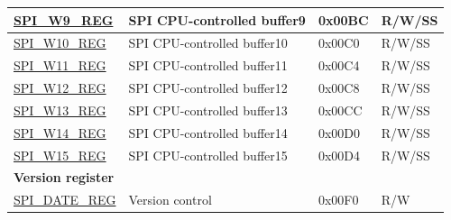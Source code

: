 \begin{longtable}{ | p{6cm} | p{6.9cm} | p{1.3cm} | p{1.5cm} | }
\hyperref[regdesc:SPIW0REG]{SPI\_W9\_REG} & SPI CPU-controlled buffer9 & 0x00BC & R/W/SS \\ \hline
\hyperref[regdesc:SPIW0REG]{SPI\_W10\_REG} & SPI CPU-controlled buffer10 & 0x00C0 & R/W/SS \\ \hline
\hyperref[regdesc:SPIW0REG]{SPI\_W11\_REG} & SPI CPU-controlled buffer11 & 0x00C4 & R/W/SS \\ \hline
\hyperref[regdesc:SPIW0REG]{SPI\_W12\_REG} & SPI CPU-controlled buffer12 & 0x00C8 & R/W/SS \\ \hline
\hyperref[regdesc:SPIW0REG]{SPI\_W13\_REG} & SPI CPU-controlled buffer13 & 0x00CC & R/W/SS \\ \hline
\hyperref[regdesc:SPIW0REG]{SPI\_W14\_REG} & SPI CPU-controlled buffer14 & 0x00D0 & R/W/SS \\ \hline
\hyperref[regdesc:SPIW0REG]{SPI\_W15\_REG} & SPI CPU-controlled buffer15 & 0x00D4 & R/W/SS \\ \hline
\multicolumn{4}{|l|}{\textbf{Version register}} \\ \hline
\hyperref[regdesc:SPIDATEREG]{SPI\_DATE\_REG} & Version control & 0x00F0 & R/W \\ \hline
\end{longtable}
